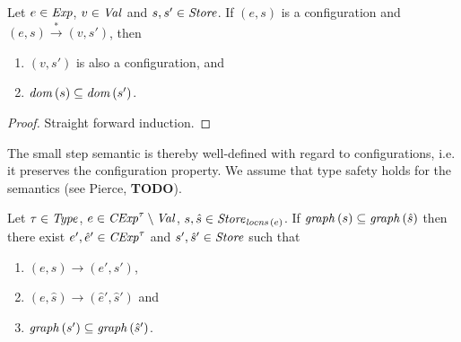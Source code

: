 \documentclass[12pt,a4paper]{report}
\newcommand{\CExp}{\nstyle{CExp}}
\begin{document}
\begin{corollary}
  Let $e\in\mathit{Exp}$, $v\in\mathit{Val}$ and $s,s'\in\mathit{Store}$. If $(e,s)$ is a configuration
  and $(e,s) \xrightarrow* (v,s')$, then
  \begin{enumerate}
    \item $(v,s')$ is also a configuration, and
    \item $\mathit{dom}\,(s) \subseteq \mathit{dom}\,(s')$.
  \end{enumerate}
\end{corollary}

\begin{proof}
  Straight forward induction.
\end{proof}

The small step semantic is thereby well-defined with regard to configurations, i.e. it preserves
the configuration property. We assume that type safety holds for the semantics (see Pierce, {\bf TODO}).

\begin{lemma} \label{lemma:Small_steps_and_graph_of_stores}
  Let $\tau\in\mathit{Type}$, $e\in\CExp^\tau\setminus\Val$, $s,\hat{s}\in\mathit{Store}_{\mathit{locns}\,(e)}$.
  If $\mathit{graph}\,(s) \subseteq \mathit{graph}\,(\hat{s})$ then there exist $e',\hat{e}'\in\CExp^\tau$
  and $s',\hat{s}'\in\mathit{Store}$ such that
  \begin{enumerate}
    \item $(e,s) \to (e',s')$,
    \item $(e,\hat{s}) \to (\hat{e}',\hat{s}')$ and
    \item $\mathit{graph}\,(s') \subseteq \mathit{graph}\,(\hat{s}')$.
  \end{enumerate}
\end{lemma}
\end{document}
